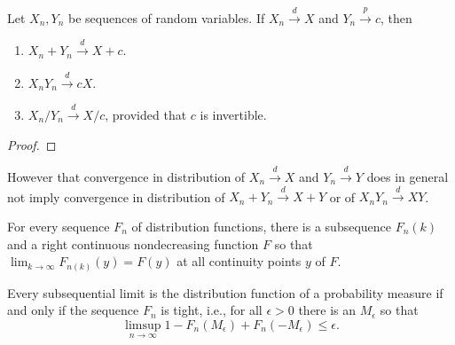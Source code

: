 \begin{theorem} \label{thm:slutsky-theorem}
    Let $X_{n}, Y_{n}$ be sequences of random variables. If $X_{n}\stackrel{d}{\rightarrow}X$ and $Y_{n}\stackrel{p}{\rightarrow}c$, then
    \begin{enumerate}
        \item $X_{n}+Y_{n}\stackrel{d}{\rightarrow}X+c$.
        \item $X_{n}Y_{n}\stackrel{d}{\rightarrow}cX$.
        \item $X_{n}/Y_{n}\stackrel{d}{\rightarrow}X/c$, provided that $c$ is invertible.
    \end{enumerate}
\end{theorem}

\begin{proof}

\end{proof}

\begin{remark}
    However that convergence in distribution of $X_{n}\stackrel{d}{\rightarrow}X$ and $Y_{n}\stackrel{d}{\rightarrow}Y$ does in general not imply convergence in distribution of $X_n+Y_n\stackrel{d}{\rightarrow}X+Y$ or of $X_nY_n\stackrel{d}{\rightarrow}XY$.
\end{remark}

\begin{theorem} \label{thm:cramer-wold-theorem}

\end{theorem}


\begin{theorem}
    For every sequence $F_{n}$ of distribution functions, there is a subsequence $F_{n}(k)$ and a right continuous nondecreasing function $F$ so that $\lim_{k\rightarrow\infty}F_{n(k)}(y)=F(y)$ at all continuity points $y$ of $F$.
\end{theorem}

\begin{theorem}
    Every subsequential limit is the distribution function of a probability measure if and only if the sequence $F_{n}$ is tight, i.e., for all $\epsilon>0$ there is an $M_{\epsilon}$ so that
    \begin{equation}
        \limsup_{n\rightarrow\infty}1-F_{n}\left(M_{\epsilon}\right)+F_{n}\left(-M_{\epsilon}\right)\leq\epsilon.
    \end{equation}
\end{theorem}

